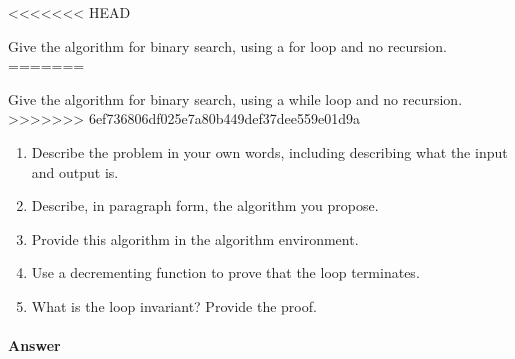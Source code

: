 \documentclass{article}
\begin{document}

\nextprob
<<<<<<< HEAD

Give the algorithm for binary search, using a for loop and no recursion.
=======

Give the algorithm for binary search, using a while loop and no recursion.
>>>>>>> 6ef736806df025e7a80b449def37dee559e01d9a

\begin{enumerate}
    \item Describe the problem in your own words, including
        describing what the input and output is.
    \item Describe, in paragraph form, the algorithm you propose.
    \item Provide this algorithm in the algorithm environment.
    \item Use a decrementing function to prove that the loop terminates.
    \item What is the loop invariant? Provide the proof.
\end{enumerate}

\paragraph{Answer}

\end{document}
